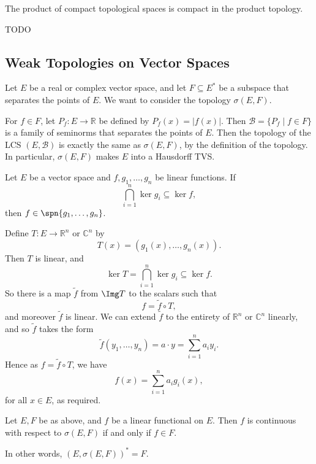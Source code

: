 \documentclass[12pt]{article}
\begin{document}
\begin{theorem}
	The product of compact topological spaces is compact in the product topology.
\end{theorem}

\begin{proofbox}
	TODO
\end{proofbox}

\subsection{Weak Topologies on Vector Spaces}%
\label{sub:wvs}

Let $E$ be a real or complex vector space, and let $F \subseteq E^{\ast}$ be a subspace that separates the points of $E$. We want to consider the topology $\sigma(E, F)$.

For $f \in F$, let $P_f : E \to \mathbb{R}$ be defined by $P_f(x) = |f(x)|$. Then $\mathcal{B} = \{P_f \mid f \in F\}$ is a family of seminorms that separates the points of $E$. Then the topology of the LCS $(E, \mathcal{B})$ is exactly the same as $\sigma(E, F)$, by the definition of the topology. In particular, $\sigma(E, F)$ makes $E$ into a Hausdorff TVS.

\begin{lemma}
	Let $E$ be a vector space and $f, g_1, \ldots, g_n$ be linear functions. If
	\[
	\bigcap_{i = 1}^n \ker g_i \subseteq \ker f,
	\]
	then $f \in \spn\{g_1, \ldots, g_n\}$.
\end{lemma}

\begin{proofbox}
	Define $T : E \to \mathbb{R}^n$ or $\mathbb{C}^n$ by
	\[
	T(x) = (g_1(x), \ldots, g_n(x)).
	\]
	Then $T$ is linear, and
	\[
	\ker T = \bigcap_{i = 1}^n \ker g_i \subseteq \ker f.
	\]
	So there is a map $\tilde f$ from $\Img T$ to the scalars such that
	\[
	f = \tilde f \circ T,
	\]
	and moreover $\tilde f$ is linear. We can extend $\tilde f$ to the entirety of $\mathbb{R}^n$ or $\mathbb{C}^n$ linearly, and so $\tilde f$ takes the form
	\[
	\tilde f(y_1, \ldots, y_n) = a \cdot y = \sum_{i = 1}^n a_i y_i.
	\]
	Hence as $f = \tilde f \circ T$, we have
	\[
	f(x) = \sum_{i = 1}^n a_i g_i(x),
	\]
	for all $x \in E$, as required.
\end{proofbox}


\begin{proposition}
	Let $E, F$ be as above, and $f$ be a linear functional on $E$. Then $f$ is continuous with respect to $\sigma(E, F)$ if and only if $f \in F$.

	In other words, $(E, \sigma(E, F))^{\ast} = F$.
\end{proposition}
\end{document}
